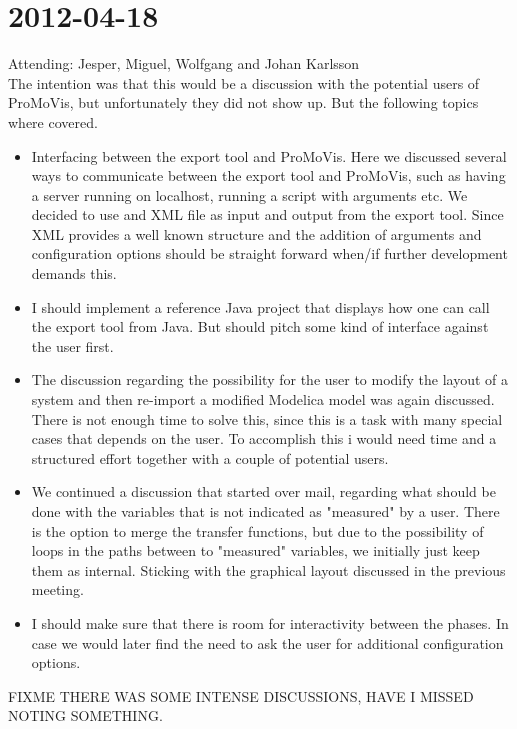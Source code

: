 \section{2012-04-18}
Attending: Jesper, Miguel, Wolfgang and Johan Karlsson\\\newline The intention was that this would be a discussion with the potential users of ProMoVis, but unfortunately they did not show up. But the following topics where covered.
\begin{itemize}
\item Interfacing between the export tool and ProMoVis. Here we discussed several ways to communicate between the export tool and ProMoVis, such as having a server running on localhost, running a script with arguments etc. We decided to use and XML file as input and output from the export tool. Since XML provides a well known structure and the addition of arguments and configuration options should be straight forward when/if further development demands this. 
\item I should implement a reference Java project that displays how one can call the export tool from Java. But should pitch some kind of interface against the user first.
\item The discussion regarding the possibility for the user to modify the layout of a system and then re-import a modified Modelica model was again discussed. There is not enough time to solve this, since this is a task with many special cases that depends on the user. To accomplish this i would need time and a structured effort together with a couple of potential users. 
\item We continued a discussion that started over mail, regarding what should be done with the variables that is not indicated as "measured" by a user. There is the option to merge the transfer functions, but due to the possibility of loops in the paths between to "measured" variables, we initially just keep them as internal. Sticking with the graphical layout discussed in the previous meeting.
\item I should make sure that there is room for interactivity between the phases. In case we would later find the need to ask the user for additional configuration options.
\end{itemize}
FIXME THERE WAS SOME INTENSE DISCUSSIONS, HAVE I MISSED NOTING SOMETHING.

